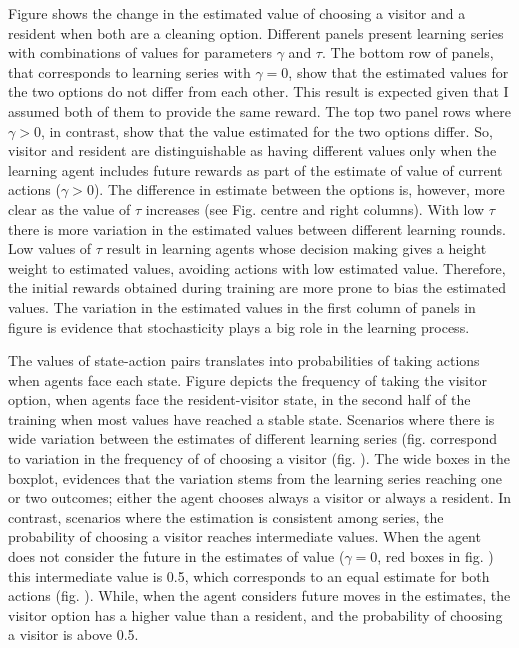 \documentclass{article}
\begin{document}
Figure  shows the change in the estimated value of choosing a visitor and a resident when both are a cleaning option. Different panels present learning series with combinations of values for parameters $\gamma$ and $\tau$. The bottom row of panels, that corresponds to learning series with $\gamma = 0$, show that the estimated values for the two options do not differ from each other. This result is expected given that I assumed both of them to provide the same reward. The top two panel rows where $\gamma > 0 $, in contrast, show that the value estimated for the two options differ. So, visitor and resident are distinguishable as having different values  only when the learning agent includes future rewards as part of the estimate of value of current actions ($\gamma>0$). The difference in estimate between the options is, however, more clear as the value of $\tau$ increases (see Fig.  centre and right columns). With low $\tau$ there is more variation in the estimated values between different learning rounds. Low values of $\tau$ result in learning agents whose decision making gives a height weight to estimated values, avoiding actions with low estimated value. Therefore, the initial rewards obtained during training are more prone to bias the estimated values. The variation in the estimated values in the first column of panels in figure  is evidence that stochasticity plays a big role in the learning process. 



The values of state-action pairs translates into probabilities of taking actions when agents face each state. Figure  depicts the frequency of taking the visitor option, when agents face the resident-visitor state, in the second half of the training when most values have reached a stable state. Scenarios where there is wide variation between the estimates of different learning series (fig.  correspond to variation in the frequency of of choosing a visitor (fig. ). The wide boxes in the boxplot, evidences that the variation stems from the learning series reaching one or two outcomes; either the agent chooses always a visitor or always a resident. In contrast, scenarios where the estimation is consistent among series, the probability of choosing a visitor reaches intermediate values. When the agent does not consider the future in the estimates of value ($\gamma = 0$, red boxes in fig. ) this intermediate value is 0.5, which corresponds to an equal estimate for both actions (fig. ). While,  when the agent considers future moves in the estimates, the visitor option has a higher value than a resident, and the probability of choosing a visitor is above 0.5.
\end{document}
